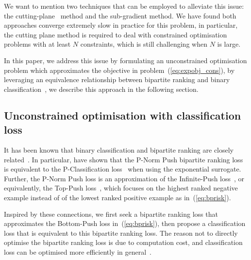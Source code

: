 We want to mention two techniques that can be employed to alleviate this issue:
the cutting-plane~\cite{avriel2003nonlinear} method and the sub-gradient method.
We have found both approaches converge extremely slow in practice for this problem, 
in particular, the cutting plane method is required to deal with constrained optimisation problems 
with at least $N$ constraints, which is still challenging when $N$ is large.

In this paper, we address this issue by formulating an unconstrained optimisation problem which approximates 
the objective in problem~(\ref{eq:expobj_cons}), by leveraging an equivalence relationship between bipartite 
ranking and binary classification~\cite{ertekin2011equivalence}, we describe this approach in the following section.




\subsection{Unconstrained optimisation with classification loss}

It has been known that binary classification and bipartite ranking are
closely related~\cite{ertekin2011equivalence,menon2016bipartite}.
In particular, \citet{ertekin2011equivalence} have shown that the P-Norm Push bipartite ranking loss~\cite{rudin2009p}
is equivalent to the P-Classification loss~\cite{ertekin2011equivalence} when using the exponential surrogate.
Further, the P-Norm Push loss is an approximation of the Infinite-Push loss~\cite{agarwal2011infinite},
or equivalently, the Top-Push loss~\cite{li2014top}, which focuses on the highest ranked negative example instead of
of the lowest ranked positive example as in~(\ref{eq:bprisk}).

Inspired by these connections, we first seek a bipartite ranking loss that approximates the Bottom-Push loss in~(\ref{eq:bprisk}),
then propose a classification loss that is equivalent to this bipartite ranking loss.
The reason not to directly optimise the bipartite ranking loss is due to computation cost,
and classification loss can be optimised more efficiently in general~\cite{ertekin2011equivalence}.

